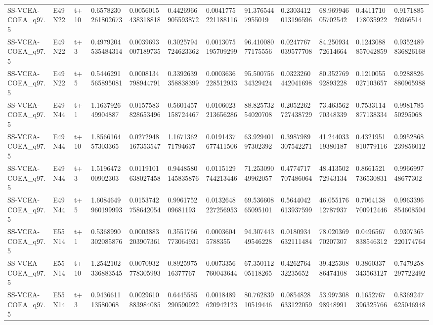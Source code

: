 \begin{landscape}
\begin{longtable}{llllllllllll}
SS-VCEA-COEA\_q97.5 & E49N22 & t+10 & 0.6578230261802673 & 0.0056015438318818 & 0.4426966905593872 & 0.0041775221188116 & 91.3765447955019 & 0.2303412013196596 & 68.96994605702542 & 0.4411710178035922 & 0.917188526966514 \\
SS-VCEA-COEA\_q97.5 & E49N22 & t+3 & 0.4979204535484314 & 0.0039693007189735 & 0.3025794724623362 & 0.0013075195709299 & 96.41008077175556 & 0.0247767039577708 & 84.25093472614664 & 0.1243088857042859 & 0.9352489836826168 \\
SS-VCEA-COEA\_q97.5 & E49N22 & t+5 & 0.5446291565895081 & 0.0008134798944791 & 0.3392639358838399 & 0.0003636228512933 & 95.50075634329424 & 0.0323260442041698 & 80.35276992893228 & 0.1210055027103657 & 0.9288826880965988 \\
SS-VCEA-COEA\_q97.5 & E49N44 & t+1 & 1.163792649904887 & 0.0157583828653496 & 0.5601457158724467 & 0.0106023213656286 & 88.82573254020708 & 0.2052262727438729 & 73.46356270348339 & 0.7533114877138334 & 0.998178550295068 \\
SS-VCEA-COEA\_q97.5 & E49N44 & t+10 & 1.856616457303365 & 0.0272948167353547 & 1.167136271794637 & 0.0191437677411506 & 63.92940197302392 & 0.3987989307542271 & 41.24403319380187 & 0.4321951810779116 & 0.9952868239856012 \\
SS-VCEA-COEA\_q97.5 & E49N44 & t+3 & 1.519647200902303 & 0.0119101638027458 & 0.9448580145835876 & 0.0115129744213446 & 71.25309049962057 & 0.4774717707486064 & 48.41350272943134 & 0.8661521736530831 & 0.996699748677302 \\
SS-VCEA-COEA\_q97.5 & E49N44 & t+5 & 1.6084649960199993 & 0.0153742758642054 & 0.996175209681193 & 0.0132648227256953 & 69.53660865095101 & 0.5644042613937599 & 46.05517612787937 & 0.7064138700912446 & 0.9963396854608504 \\
SS-VCEA-COEA\_q97.5 & E55N14 & t+1 & 0.5368990302085876 & 0.0003883203907361 & 0.3551766773064931 & 0.00036045788355 & 94.30744349546228 & 0.0180934632111484 & 78.02036970207307 & 0.0496567838546312 & 0.9307365220174764 \\
SS-VCEA-COEA\_q97.5 & E55N14 & t+10 & 1.2542102336883545 & 0.0070932778305993 & 0.892597516377767 & 0.0073356760043644 & 67.35011205118265 & 0.426276432235652 & 39.42530886474108 & 0.3860337343563127 & 0.7479258297722492 \\
SS-VCEA-COEA\_q97.5 & E55N14 & t+3 & 0.943661113580068 & 0.0029610883984085 & 0.6445585290590922 & 0.0018489620942123 & 80.76283910519446 & 0.0854828633122059 & 53.99730898948991 & 0.1652767396325766 & 0.8369247625046948 \\

\end{longtable}
\end{landscape}
